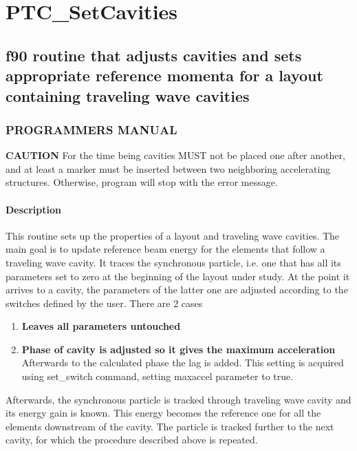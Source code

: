 


\section{PTC\_SetCavities}

\subsection{ f90 routine that adjusts cavities and sets appropriate reference momenta         for a layout containing traveling wave cavities    }


\subsubsection{ PROGRAMMERS MANUAL }

\textbf{ CAUTION } For the time being cavities MUST not be placed  one after another, and at least a marker must be inserted between two  neighboring accelerating structures.  Otherwise, program will stop with the error message.   

\paragraph{ Description }

 This routine sets up the properties of a layout and traveling wave cavities.  The main goal is to update  reference beam energy for the elements  that follow a traveling wave cavity.  It traces the synchronous particle, i.e. one that has  all its parameters set to zero at the beginning of the layout under study. At the point it arrives to a cavity,  the parameters of the latter one are adjusted according to the switches  defined by the user. There are 2 cases  
\begin{enumerate}
	\item \textbf{Leaves all parameters untouched}
	\item \textbf{Phase of cavity is adjusted so it gives the maximum acceleration }           Afterwards to the calculated phase the lag is added.          This setting is acquired using set\_switch command, setting maxaccel          parameter to true.  
\end{enumerate} Afterwards,  the synchronous particle is tracked through traveling wave cavity  and its energy gain is known.  This energy becomes the reference one for all the elements downstream of the cavity.  The particle is tracked further to the next cavity,  for which the procedure described above is repeated.   

